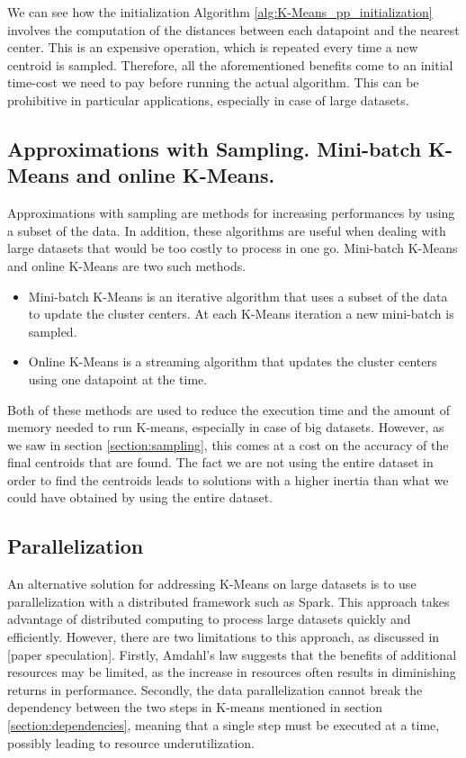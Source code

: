 We can see how the initialization Algorithm \ref{alg:K-Means_pp_initialization} involves the computation of the distances between each datapoint and the nearest center. This is an expensive operation, which is repeated every time a new centroid is sampled. Therefore, all the aforementioned benefits come to an initial time-cost we need to pay before running the actual algorithm. This can be prohibitive in particular applications, especially in case of large datasets.

\subsection{Approximations with Sampling. Mini-batch K-Means and online K-Means.}
\label{section:approximation}
Approximations with sampling are methods for increasing performances by using a subset of the data. In addition, these algorithms are useful when dealing with large datasets that would be too costly to process in one go. 
Mini-batch K-Means and online K-Means are two such methods. 
\begin{itemize}
    \item Mini-batch K-Means is an iterative algorithm that uses a subset of the data to update the cluster centers. At each K-Means iteration a new mini-batch is sampled.
    \item Online K-Means is a streaming algorithm that updates the cluster centers using one datapoint at the time.
\end{itemize}
Both of these methods are used to reduce the execution time and the amount of memory needed to run K-means, especially in case of big datasets. However, as we saw in section \ref{section:sampling}, this comes at a cost on the accuracy of the final centroids that are found. The fact we are not using the entire dataset in order to find the centroids leads to solutions with a higher inertia than what we could have obtained by using the entire dataset.

\subsection{Parallelization}
\label{section:parallelization}
An alternative solution for addressing K-Means on large datasets is to use parallelization with a distributed framework such as Spark. This approach takes advantage of distributed computing to process large datasets quickly and efficiently. However, there are two limitations to this approach, as discussed in [paper speculation]. Firstly, Amdahl's law suggests that the benefits of additional resources may be limited, as the increase in resources often results in diminishing returns in performance. Secondly, the data parallelization cannot break the dependency between the two steps in K-means mentioned in section \ref{section:dependencies}, meaning that a single step must be executed at a time, possibly leading to resource underutilization.

